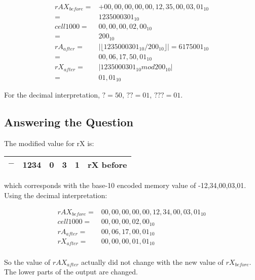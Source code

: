 \documentclass{article}
\begin{document}
\begin{align*}
    rAX_{before} = &+00,00,00,00,00,12,35,00,03,01_{10} \\
    = &1235000301_{10} \\
    cell1000 = &00,00,00,02,00_{10} \\
    = &200_{10} \\
    rA_{after} = &| \lfloor 1235000301_{10} / 200_{10} \rfloor | = 6175001_{10} \\
    = & 00,06,17,50,01_{10} \\
    rX_{after} = &| 1235000301_{10} mod 200_{10} | \\
    = & 01,01_{10}
\end{align*}

For the decimal interpretation, $? = 50$, $?? = 01$, $??? = 01$.

\subsection*{Answering the Question}

The modified value for rX is:

\vspace*{1em}

\begin{tabular}{|c|c|c|c|c|c|c|}
    \hline
    $-$ & \multicolumn{2}{c|}{1234} & 0 & 3 & 1 & rX before \\
    \hline
\end{tabular}

\vspace*{1em}

which corresponds with the base-10 encoded memory value of
-12,34,00,03,01.  Using the decimal interpretation:

\begin{align*}
    rAX_{before} = &00,00,00,00,00,12,34,00,03,01_{10} \\
    cell1000 = &00,00,00,02,00_{10} \\
    rA_{after} = &00,06,17,00,01_{10} \\
    rX_{after} = &00,00,00,01,01_{10} \\
\end{align*}

So the value of $rAX_{after}$ actually did not change with the
new value of $rX_{before}$. The lower parts of the output are
changed.
\end{document}
